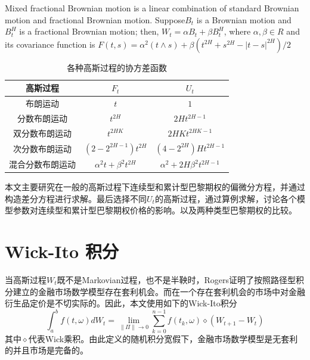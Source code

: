 \documentclass{ctexart} %
\begin{document}
Mixed fractional Brownian motion is a linear combination of standard Brownian motion and fractional Brownian motion. Suppose$B_t$ is a Brownian motion and $B_t^H$ is a fractional Brownian motion; then, $W_t=\alpha B_t+\beta B_t^H$, where $\alpha,\beta \in R$ and its covariance function is  $F(t,s)=\alpha^2(t\wedge s)+\beta(t^{2H}+s^{2H}-|t-s|^{2H})/2$ 
\begin{table}[htbp]
\centering
\caption{各种高斯过程的协方差函数}
\label{tabl1}
\begin{tabular}{ccc}
\hline
高斯过程& $F_t$ & $U_t$ \\
\hline
布朗运动 & $t$ & $1$ \\
分数布朗运动 & $t^{2H}$ & $2Ht^{2H-1}$ \\
双分数布朗运动 & $t^{2HK}$ & $2HKt^{2HK-1}$ \\
次分数布朗运动 & $(2-2^{2H-1})t^{2H}$ & $(4-2^{2H})Ht^{2H-1}$ \\
混合分数布朗运动 & $\alpha^2t+\beta^2t^{2H}$ & $\alpha^2+2H\beta^2t^{2H-1}$ \\
\hline
\end{tabular}
\end{table}

本文主要研究在一般的高斯过程下连续型和累计型巴黎期权的偏微分方程，并通过构造差分方程进行求解。最后选择不同$U_t$的高斯过程，通过算例求解，讨论各个模型参数对连续型和累计型巴黎期权价格的影响。以及两种类型巴黎期权的比较。


\section{Wick-Ito 积分}
当高斯过程$W_t$既不是Markovian过程，也不是半鞅时，Rogers证明了按照路径型积分建立的金融市场数学模型存在套利机会。而在一个存在套利机会的市场中对金融衍生品定价是不切实际的。因此，本文使用如下的Wick-Ito积分
\begin{equation}
\int_a^bf(t,\omega)dW_t=\lim_{\| \Pi\| \rightarrow0}\sum^{n-1}_{k=0}f(t_k,\omega)\diamond (W_{t+1}-W_t)
\end{equation}
其中$\diamond$代表Wick乘积。由此定义的随机积分宽假下，金融市场数学模型是无套利的并且市场是完备的。
\end{document}
